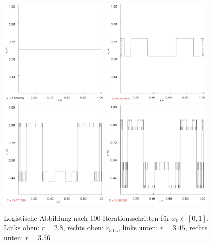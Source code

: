 \documentclass[11,5pt, twoside]{article}
\begin{document}
\begin{figure}[!htbp]
	\centering
	\includegraphics[width=200px]{logi/kurve280}
	\includegraphics[width=200px]{logi/kurve305}
	\includegraphics[width=200px]{logi/kurve347}
	\includegraphics[width=200px]{logi/kurve356}
	\caption{Logistische Abbildung nach 100 Iterationsschritten für $x_0\in[0,1]$. Links oben: $r=2.8$, rechts oben: $r_3.05$, links unten: $r=3.45$, rechts unten: $r=3.56$}
	\label{fig:logi-kont}
\end{figure}
\end{document}
